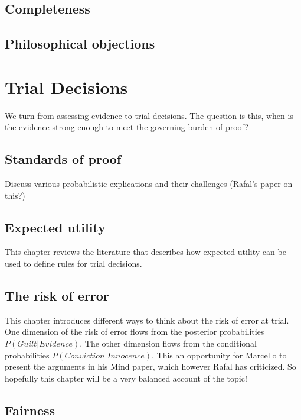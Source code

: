 \documentclass[]{book}
\begin{document}
\chapter{Completeness}

\chapter{Philosophical objections}


\part{Trial Decisions}

We turn from assessing evidence to trial decisions. The question is
this, when is the evidence strong enough to meet the governing burden of
proof?

\chapter{Standards of proof}

Discuss various probabilistic explications and their challenges (Rafal's
paper on this?)

\chapter{Expected utility}

This chapter reviews the literature that describes how expected utility
can be used to define rules for trial decisions.

\chapter{The risk of error}

This chapter introduces different ways to think about the risk of error
at trial. One dimension of the risk of error flows from the posterior
probabilities \(P(Guilt | Evidence)\). The other dimension flows from
the conditional probabilities \(P(Conviction | Innocence)\). This an
opportunity for Marcello to present the arguments in his Mind paper,
which however Rafal has criticized. So hopefully this chapter will be a
very balanced account of the topic!

\chapter{Fairness}
\end{document}
